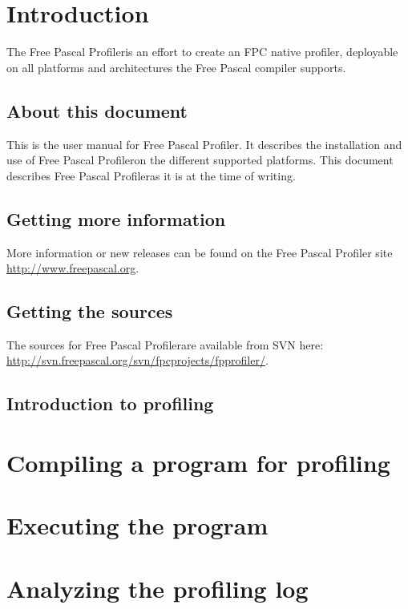 \documentclass[twoside]{book}
\newcommand{\fpp}{Free Pascal Profiler}
\newcommand{\fpprofilerwebsite}{\url{http://www.freepascal.org}}
\begin{document}
\tableofcontents

\chapter{Introduction}
The \fpp is an effort to create an FPC native profiler, deployable on all platforms and
architectures the Free Pascal compiler supports.

\section{About this document}
This is the user manual for \fpp. It describes the
installation and use of \fpp on the different supported
platforms. This document describes \fpp as it is at the time
of writing.

\section{Getting more information}
More information or new releases can be found on the \fpp
site \fpprofilerwebsite.

\section{Getting the sources}
The sources for \fpp are available from SVN here: \url{http://svn.freepascal.org/svn/fpcprojects/fpprofiler/}.

\section{Introduction to profiling}

\chapter{Compiling a program for profiling}

\chapter{Executing the program}

\chapter{Analyzing the profiling log}
\end{document}
